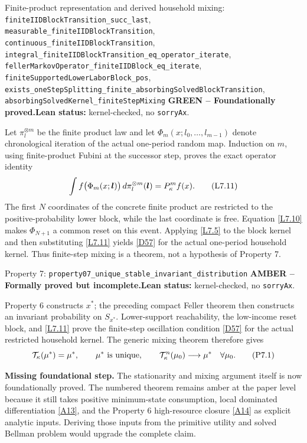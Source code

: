 \documentclass[11pt]{article}
\newcommand{\leanname}[1]{\nolinkurl{#1}}
\newcommand{\eqP}[1]{\refstepcounter{equation}\tag{P#1}}
\newcommand{\eqL}[1]{\refstepcounter{equation}\tag{L#1}}
\newcommand{\formalcheck}{\textbf{Lean status:} kernel-checked, no \texttt{sorryAx}.}
\newcommand{\missing}[1]{\par\smallskip\textbf{Missing foundational step.} #1}
\newcommand{\greenstatus}{\textcolor{proved}{\textbf{GREEN -- Foundationally proved.}}}
\newcommand{\amberstatus}{\textcolor{conditional}{\textbf{AMBER -- Formally proved but incomplete.}}}
\begin{document}
\begin{greenbox}{Finite-product representation and derived household mixing:
\leanname{finiteIIDBlockTransition_succ_last},
\leanname{measurable_finiteIIDBlockTransition},
\leanname{continuous_finiteIIDBlockTransition},
\leanname{integral_finiteIIDBlockTransition_eq_operator_iterate},
\leanname{fellerMarkovOperator_finiteIIDBlock_eq_iterate},
\leanname{finiteSupportedLowerLaborBlock_pos},
\leanname{exists_oneStepSplitting_finite_absorbingSolvedBlockTransition},
\leanname{absorbingSolvedKernel_finiteStepMixing}}
\greenstatus\quad\formalcheck

Let $\pi_l^{\otimes m}$ be the finite product law and let
$\Phi_m(x;l_0,\ldots,l_{m-1})$ denote chronological iteration of the actual
one-period random map.  Induction on $m$, using finite-product Fubini at the
successor step, proves the exact operator identity
\begin{equation}
 \int f\bigl(\Phi_m(x;\boldsymbol l)\bigr)\,
       d\pi_l^{\otimes m}(\boldsymbol l)
   =P_\kappa^m f(x).
 \eqL{7.11}\label{L7.11}
\end{equation}
The first $N$ coordinates of the concrete finite product are restricted to
the positive-probability lower block, while the last coordinate is free.
Equation \eqref{L7.10} makes $\Phi_{N+1}$ a common reset on this event.
Applying \eqref{L7.5} to the block kernel and then substituting
\eqref{L7.11} yields \eqref{D57} for the actual one-period household kernel.
Thus finite-step mixing is a theorem, not a hypothesis of Property 7.
\end{greenbox}

\begin{amberbox}{Property 7: \leanname{property07_unique_stable_invariant_distribution}}
\amberstatus\quad\formalcheck

Property 6 constructs \(x^*\); the preceding compact Feller theorem then
constructs an invariant probability on \(S_{x^*}\).  Lower-support
reachability, the low-income reset block, and \eqref{L7.11} prove the
finite-step oscillation condition \eqref{D57} for the actual restricted
household kernel.  The generic mixing theorem therefore gives
\begin{equation}
 \mathcal T_\kappa(\mu^*)=\mu^*,\qquad
 \mu^*\text{ is unique},\qquad
 \mathcal T_\kappa^n(\mu_0)\longrightarrow\mu^*\quad\forall\mu_0. \eqP{7.1}\label{P7.1}
\end{equation}

\missing{The stationarity and mixing argument itself is now foundationally
proved.  The numbered theorem remains amber at the paper level because it
still takes positive minimum-state consumption, local dominated
differentiation \eqref{A13}, and the Property 6 high-resource closure
\eqref{A14} as explicit analytic inputs.  Deriving those inputs from the
primitive utility and solved Bellman problem would upgrade the complete claim.}
\end{amberbox}
\end{document}
